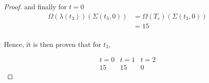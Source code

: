 \documentclass{article}
\begin{document}
\begin{proof}
	and finally for \(t = 0\)
	\begin{align*}
		\Omega(\lambda(t_{3}))(\Sigma(t_{3}, 0)) &= \Omega(T_{c})(\Sigma(t_{3}, 0)) \\
		& = 15 \\ 
	\end{align*}

	Hence, it is then proven that for \(t_{3}\),

	\begin{displaymath}
		\begin{array}{|c|c|c|}
			t = 0 & t = 1 & t = 2\\
 		\hline
			 15 & 15 & 0
 		\end{array}
	\end{displaymath}
\end{proof}
\end{document}
